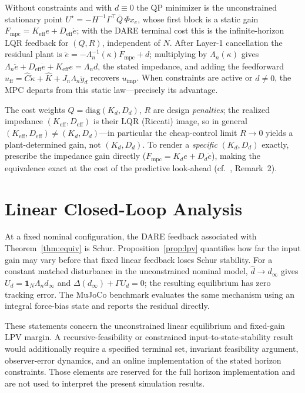 \begin{IEEEproof}
Without constraints and with $d\equiv0$ the QP minimizer is the unconstrained stationary point $U^\star=-H^{-1}\Gamma^\top\bar Q\,\Phi x_e$, whose first block is a static gain $F_{\text{mpc}}=K_{\text{eff}}e+D_{\text{eff}}\dot e$; with the DARE terminal cost this is the infinite-horizon LQR feedback for $(Q,R)$, independent of $N$. After Layer-1 cancellation the residual plant is $\ddot e=-\Lambda_n^{-1}(\kappa)F_{\text{mpc}}+d$; multiplying by $\Lambda_n(\kappa)$ gives $\Lambda_n\ddot e+D_{\text{eff}}\dot e+K_{\text{eff}}e=\Lambda_n d$, the stated impedance, and adding the feedforward $u_{\text{ff}}=\hat C\dot\kappa+\hat K+J_n\Lambda_n\ddot y_d$ recovers $u_{\text{imp}}$. When constraints are active or $d\neq0$, the MPC departs from this static law---precisely its advantage.
\end{IEEEproof}

\begin{remark}\label{rmk:realized}
The cost weights $Q=\text{diag}(K_d,D_d)$, $R$ are design \emph{penalties}; the realized impedance $(K_{\text{eff}},D_{\text{eff}})$ is their LQR (Riccati) image, so in general $(K_{\text{eff}},D_{\text{eff}})\neq(K_d,D_d)$---in particular the cheap-control limit $R\to0$ yields a plant-determined gain, not $(K_d,D_d)$. To render a \emph{specific} $(K_d,D_d)$ exactly, prescribe the impedance gain directly ($F_{\text{mpc}}=K_d e+D_d\dot e$), making the equivalence exact at the cost of the predictive look-ahead (cf.~\cite{cao2026phri}, Remark~2).
\end{remark}

\section{Linear Closed-Loop Analysis}\label{sec:stability}

At a fixed nominal configuration, the DARE feedback associated with Theorem~\ref{thm:equiv} is Schur. Proposition~\ref{prop:lpv} quantifies how far the input gain may vary before that fixed linear feedback loses Schur stability. For a constant matched disturbance in the unconstrained nominal model, $\hat d\to d_\infty$ gives $U_d=\mathbf{1}_N\Lambda_n d_\infty$ and $\Delta(d_\infty)+\Gamma U_d=0$; the resulting equilibrium has zero tracking error. The MuJoCo benchmark evaluates the same mechanism using an integral force-bias state and reports the residual directly.

These statements concern the unconstrained linear equilibrium and fixed-gain LPV margin. A recursive-feasibility or constrained input-to-state-stability result would additionally require a specified terminal set, invariant feasibility argument, observer-error dynamics, and an online implementation of the stated horizon constraints. Those elements are reserved for the full horizon implementation and are not used to interpret the present simulation results.

